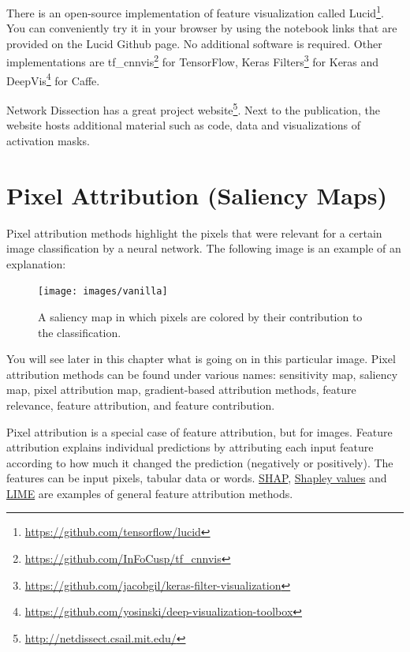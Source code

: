 \documentclass[
  10pt,
]{scrbook}
\renewcommand{\href}[2]{#2\footnote{\url{#1}}}
\begin{document}
There is an open-source implementation of feature visualization called \href{https://github.com/tensorflow/lucid}{Lucid}.
You can conveniently try it in your browser by using the notebook links that are provided on the Lucid Github page.
No additional software is required.
Other implementations are \href{https://github.com/InFoCusp/tf_cnnvis}{tf\_cnnvis} for TensorFlow, \href{https://github.com/jacobgil/keras-filter-visualization}{Keras Filters} for Keras and \href{https://github.com/yosinski/deep-visualization-toolbox}{DeepVis} for Caffe.

Network Dissection has a great \href{http://netdissect.csail.mit.edu/}{project website}.
Next to the publication, the website hosts additional material such as code, data and visualizations of activation masks.

\newpage

\hypertarget{pixel-attribution}{%
\section{Pixel Attribution (Saliency Maps)}\label{pixel-attribution}}

Pixel attribution methods highlight the pixels that were relevant for a certain image classification by a neural network.
The following image is an example of an explanation:

\begin{figure}

{\centering \texttt{[image: images/vanilla]} 

}

\caption{A saliency map in which pixels are colored by their contribution to the classification.}\label{fig:unnamed-chunk-58}
\end{figure}

You will see later in this chapter what is going on in this particular image.
Pixel attribution methods can be found under various names: sensitivity map, saliency map, pixel attribution map, gradient-based attribution methods, feature relevance, feature attribution, and feature contribution.

Pixel attribution is a special case of feature attribution, but for images.
Feature attribution explains individual predictions by attributing each input feature according to how much it changed the prediction (negatively or positively).
The features can be input pixels, tabular data or words.
\protect\hyperlink{shap}{SHAP}, \protect\hyperlink{shapley}{Shapley values} and \protect\hyperlink{lime}{LIME} are examples of general feature attribution methods.
\end{document}
